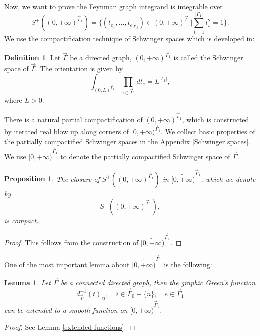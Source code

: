 \documentclass[11pt]{amsart}
\newtheorem{lem}[thm]{Lemma}
\newtheorem{prop}[thm]{Proposition}
\theoremstyle{definition}
\newtheorem{defn}[thm]{Definition}
\theoremstyle{remark}
\numberwithin{equation}{section}
\begin{document}
Now, we want to prove the Feynman graph integrand is integrable over 
$$
S^{+}((0,+\infty)^{\vec{\Gamma}_{1}})=\{(t_{e_{1}},\dots,t_{e_{|\Gamma_{1}|}})\in(0,+\infty)^{\vec{\Gamma}_{1}}|\sum_{i=1}^{|\Gamma_{1}|}t_{i}^{2}=1\}.
$$
We use the compactification technique of Schwinger spaces which is developed in:
\begin{defn}
    Let $\vec{\Gamma}$ be a directed graph, $(0,+\infty)^{\vec{\Gamma}_{1}}$ is called the Schwinger space of $\vec{\Gamma}$. The orientation is given by
    $$
    \int_{(0,L)^{\vec{\Gamma}_{1}}}\prod_{e\in\vec{\Gamma}_{1}}dt_{e}=L^{|\Gamma_{1}|},
    $$
    where $L>0$.
\end{defn}

There is a natural partial compactification of $(0,+\infty)^{\vec{\Gamma}_{1}}$, which is constructed by iterated real blow up along corners of $[0,+\infty)^{\vec{\Gamma}_{1}}$. We collect basic properties of the partially compactified Schwinger spaces in the Appendix \ref{Schwinger spaces}. We use $\widetilde{[0,+\infty)}^{\vec{\Gamma}_{1}}$ to denote the partially compactified Schwinger space of $\vec{\Gamma}$.
\begin{prop}
    The closure of $S^{+}((0,+\infty)^{\vec{\Gamma}_{1}})$ in $\widetilde{[0,+\infty)}^{\vec{\Gamma}_{1}}$, which we denote by 
    $$
    \bar{S}^{+}((0,+\infty)^{\vec{\Gamma}_{1}}),
    $$
    is compact.
\end{prop}
\begin{proof}
    This follows from the construction of $\widetilde{[0,+\infty)}^{\vec{\Gamma}_{1}}$.
\end{proof}

One of the most important lemma about $\widetilde{[0,+\infty)}^{\vec{\Gamma}_{1}}$ is the following:
\begin{lem}
    Let $\vec{\Gamma}$ be a connected directed graph, then the graphic Green's function
    $$
    d^{-1}_{\vec{\Gamma}}(t)_{ei}, \quad i\in \vec{\Gamma}_{0}-\{n\},\quad e\in \vec{\Gamma}_{1}
    $$
    can be extended to a smooth function on $\widetilde{[0,+\infty)}^{\vec{\Gamma}_{1}}$.
\end{lem}
\begin{proof}
    See Lemma \ref{extended functions}.
\end{proof}
\end{document}
